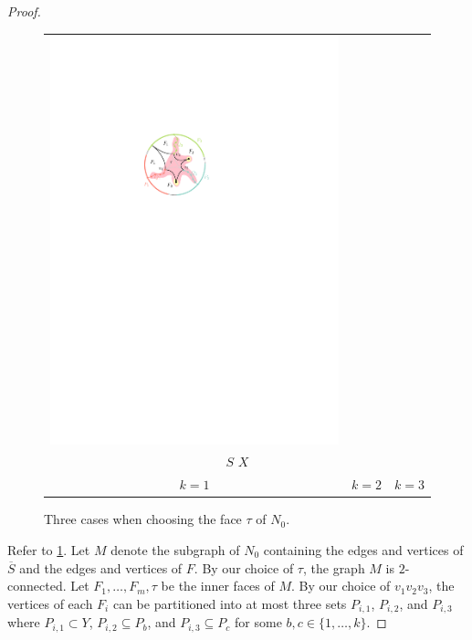\documentclass{patmorin}
\theoremstyle{plain}
\theoremstyle{definition}
\begin{document}
\begin{proof}
\begin{figure}
\begin{center}
\begin{tabular}{c@{}c@{}c}
				\includegraphics{figs/zoomba-3} \\
        \multicolumn{3}{c}{{\color{brew8}\raisebox{-3pt}{\rule{12pt}{12pt}}} $S$\qquad {\color{brew2}\raisebox{-3pt}{\rule{12pt}{12pt}}} $X$} \\
				$k=1$ & $k=2$ & $k=3$
			\end{tabular}
		\end{center}
		\caption{Three cases when choosing the face $\tau$ of $N_0$.}
		\label{boring_figure}
	\end{figure}

	Refer to \cref{boring_figure}.  Let $M$ denote the subgraph of $N_0$ containing the edges and vertices of $\overline{S}$ and the edges and vertices of $F$. By our choice of $\tau$, the graph $M$ is $2$-connected.
	Let $F_1,\ldots,F_m,\tau$ be the inner faces of $M$. By our choice of $v_1v_2v_3$, the vertices of each $F_i$ can be partitioned into at most three sets $P_{i,1}$, $P_{i,2}$, and $P_{i,3}$ where $P_{i,1}\subset Y$, $P_{i,2}\subseteq P_b$, and $P_{i,3}\subseteq P_c$ for some $b,c\in\{1,\ldots,k\}$.


\end{proof}
\end{document}
